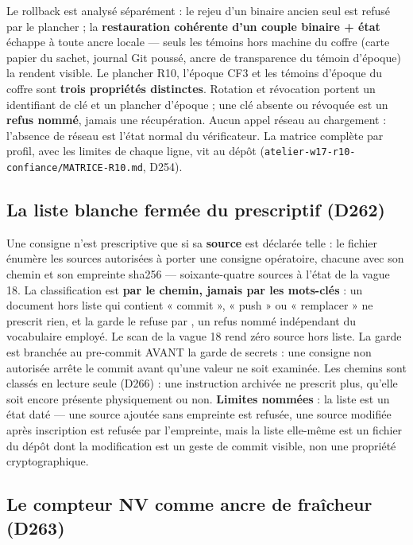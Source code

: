 Le rollback est analysé séparément : le rejeu d’un binaire ancien seul est refusé par le plancher ; la
\textbf{restauration cohérente d’un couple binaire + état} échappe à toute ancre locale — seuls les témoins
hors machine du coffre (carte papier du sachet, journal Git poussé, ancre de transparence du témoin
d’époque) la rendent visible. Le plancher R10, l’époque CF3 et les témoins d’époque du coffre sont
\textbf{trois propriétés distinctes}. Rotation et révocation portent un identifiant de clé et un plancher
d’époque ; une clé absente ou révoquée est un \textbf{refus nommé}, jamais une récupération. Aucun appel
réseau au chargement : l’absence de réseau est l’état normal du vérificateur. La matrice complète par
profil, avec les limites de chaque ligne, vit au dépôt (\texttt{atelier-w17-r10-confiance/MATRICE-R10.md},
D254).

\subsection{La liste blanche fermée du prescriptif (D262)}\label{sec:prescriptif}

Une consigne n'est prescriptive que si sa \textbf{source} est déclarée telle : le fichier
 énumère les sources autorisées à porter une consigne
opératoire, chacune avec son chemin et son empreinte sha256 — soixante-quatre sources à
l'état de la vague 18. La classification est \textbf{par le chemin, jamais par les mots-clés} :
un document hors liste qui contient « commit », « push » ou « remplacer » ne prescrit rien,
et la garde le refuse par , un refus nommé indépendant du
vocabulaire employé. Le scan de la vague 18 rend zéro source hors liste. La garde est
branchée au pre-commit AVANT la garde de secrets : une consigne non autorisée arrête le
commit avant qu'une valeur ne soit examinée. Les chemins  sont classés
en lecture seule (D266) : une instruction archivée ne prescrit plus, qu'elle soit encore
présente physiquement ou non. \textbf{Limites nommées} : la liste est un état daté — une
source ajoutée sans empreinte est refusée, une source modifiée après inscription est
refusée par l'empreinte, mais la liste elle-même est un fichier du dépôt dont la
modification est un geste de commit visible, non une propriété cryptographique.

\subsection{Le compteur NV comme ancre de fraîcheur (D263)}\label{sec:nv}

